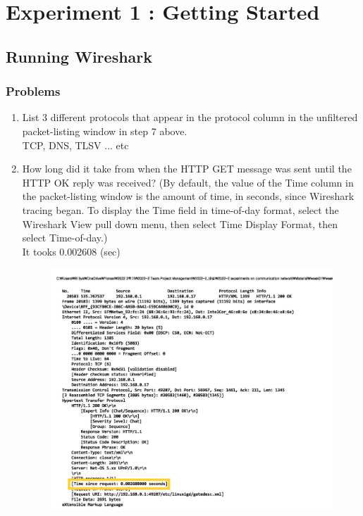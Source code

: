 \section{Experiment 1 : Getting Started}
\subsection{Running Wireshark}
    \subsubsection*{Problems}
    \begin{enumerate}[label=\bfseries Problem \arabic*:,leftmargin=*,labelindent=1em]
        \item List 3 different protocols that appear in the protocol column in the unfiltered packet-listing window in step 7 above.\\[0.2mm]
            \soln TCP, DNS, TLSV ... etc
        \item How long did it take from when the HTTP GET message was sent until the HTTP OK reply was received? 
        (By default, the value of the Time column in the packet-listing window is the amount of time, in seconds, 
        since Wireshark tracing began. To display the Time field in time-of-day format,
        select the Wireshark View pull down menu, then select Time Display Format, then select Time-of-day.) \\[0.2mm]
            \soln It tooks 0.002608 (sec)
            \vspace{-4mm}  
            \begin{figure}[!h]\centering
        		\includegraphics[width=.85\textwidth]{image/result_week01/Q1-2.jpg}

\end{figure}
\end{enumerate}
